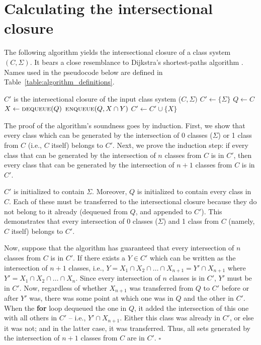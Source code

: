 \documentclass[12pt, oneside]{article}   	%
\begin{document}
\appendix

\section{Calculating the intersectional closure}
\label{app:closure}
The following algorithm yields the intersectional closure of a class system $(C, \Sigma)$. It bears a close resemblance to Dijkstra's shortest-paths algorithm \cite{Dijkstra1959}. Names used in the pseudocode below are defined in Table~\ref{table:algorithm_definitions}.
\noindent \begin{algorithmic}
	\singlespacing
	\ENSURE $C'$ is the intersectional closure of the input class system ($C, \Sigma)$
	\STATE
	\STATE $C' \leftarrow \{ \Sigma \} $
	\STATE $Q \leftarrow C$
	\STATE
	\STATE $X \leftarrow \textsc{dequeue}(Q)$
	\STATE $\textsc{enqueue}(Q, X \cap Y)$
	\ENDFOR
	\STATE $C' \leftarrow C' \cup \{ X \}$
	\ENDIF
	\ENDWHILE
\end{algorithmic}
\doublespacing

\noindent The proof of the algorithm's soundness goes by induction. First, we show that every class which can be generated by the intersection of $0$ classes ($\Sigma$) or 1 class from $C$ (i.e., $C$ itself) belongs to $C'$. Next, we prove the induction step: if every class that can be generated by the intersection of $n$ classes from $C$ is in $C'$, then every class that can be generated by the intersection of $n+1$ classes from $C$ is in $C'$.

$C'$ is initialized to contain $\Sigma$. Moreover, $Q$ is initialized to contain every class in $C$. Each of these must be transferred to the intersectional closure because they do not belong to it already (dequeued from $Q$, and appended to $C'$). This demonstrates that every intersection of 0 classes ($\Sigma$) and 1 class from $C$ (namely, $C$ itself) belongs to $C'$.

Now, suppose that the algorithm has guaranteed that every intersection of $n$ classes from $C$ is in $C'$. If there exists a $Y \in C'$ which can be written as the intersection of $n+1$ classes, i.e., $Y = X_1 \cap X_2 \cap \ldots \cap X_{n+1} = Y' \cap X_{n+1}$ where $Y' = X_1 \cap X_2 \cap \ldots \cap X_n$. Since every intersection of $n$ classes is in $C'$, $Y'$ must be in $C'$. Now, regardless of whether $X_{n+1}$ was transferred from $Q$ to $C'$ before or after $Y'$ was, there was some point at which one was in $Q$ and the other in $C'$. When the \textbf{for} loop dequeued the one in $Q$, it added the intersection of this one with all others in $C'$ -- i.e., $Y' \cap X_{n+1}$. Either this class was already in $C'$, or else it was not; and in the latter case, it was transferred. Thus, all sets generated by the intersection of $n+1$ classes from $C$ are in $C'$. $\square$
\end{document}
